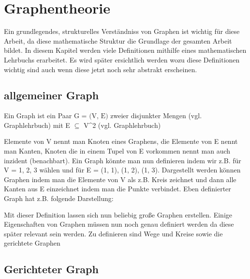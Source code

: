 \section{Graphentheorie}

Ein grundlegendes, strukturelles Verständniss von Graphen ist wichtig für diese Arbeit, da diese mathematische Struktur
die Grundlage der gesamten Arbeit bildet. In diesem Kapitel werden viele Definitionen mithilfe eines mathematischen
Lehrbuchs erarbeitet. Es wird später ersichtlich werden wozu diese Definitionen wichtig sind auch wenn diese jetzt noch
sehr abstrakt erscheinen.

\subsection{allgemeiner Graph}

Ein Graph ist ein Paar $\textrm{G = (V, E)}$ zweier disjunkter Mengen (vgl. Graphlehrbuch) mit E $\subseteq$ V^2 (vgl. Graphlehrbuch)

Elemente von V nennt man Knoten eines Graphens, die Elemente von E nennt man Kanten, Knoten die in einem Tupel von E vorkommen
nennt man auch inzident (benachbart).
Ein Graph könnte man nun definieren indem wir z.B. für V = {1, 2, 3} wählen und für E = {(1, 1), (1, 2), (1, 3)}.
Dargestellt werden können Graphen indem man die Elemente von V als z.B. Kreis zeichnet und dann alle Kanten aus E
einzeichnet indem man die Punkte verbindet. Eben definierter Graph hat z.B. folgende Darstellung:

\begin{center}
\end{center}

Mit dieser Definition lassen sich nun beliebig große Graphen erstellen.
Einige Eigenschaften von Graphen müssen nun noch genau definiert werden da diese später relevant sein werden.
Zu definieren sind Wege und Kreise sowie die gerichtete Graphen

\subsection{Gerichteter Graph}

